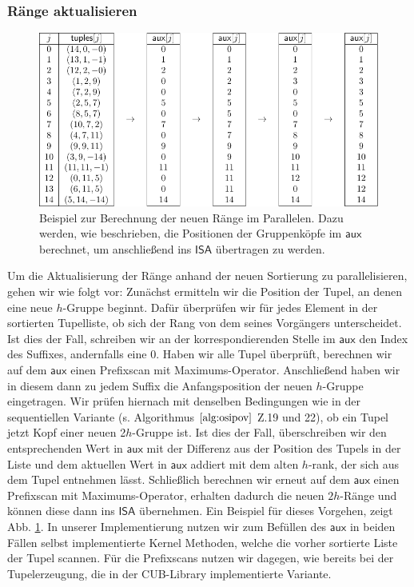 \subsubsection{Ränge aktualisieren}
\begin{figure}
\includegraphics[scale=0.9]{kapitel/saca_algorithmen/osipov/update_ranks_example.pdf}
\caption{Beispiel zur Berechnung der neuen Ränge im Parallelen. Dazu werden, wie beschrieben, die Positionen der Gruppenköpfe im $\mathsf{aux}$ berechnet, um anschließend ins $\mathsf{ISA}$ übertragen zu werden.}
\label{osipov:update}
\end{figure}
Um die Aktualisierung der Ränge anhand der neuen Sortierung zu parallelisieren, gehen wir wie folgt vor:
Zunächst ermitteln wir die Position der Tupel, an denen eine neue $h$-Gruppe beginnt. Dafür überprüfen wir für jedes Element in der sortierten Tupelliste, ob sich der Rang von dem seines Vorgängers unterscheidet. Ist dies der Fall, schreiben wir an der korrespondierenden Stelle im $\mathsf{aux}$ den Index des Suffixes, andernfalls eine 0. Haben wir alle Tupel überprüft, berechnen wir auf dem $\mathsf{aux}$ einen Prefixscan mit Maximums-Operator. Anschließend haben wir in diesem dann zu jedem Suffix die Anfangsposition der neuen $h$-Gruppe eingetragen. 
Wir prüfen hiernach mit denselben Bedingungen wie in der sequentiellen Variante (s. Algorithmus $\ref{alg:osipov}$ Z.19 und 22), ob ein Tupel jetzt Kopf einer neuen 2$h$-Gruppe ist. Ist dies der Fall, überschreiben wir den entsprechenden Wert in $\mathsf{aux}$ mit der Differenz aus der Position des Tupels in der Liste und dem aktuellen Wert in $\mathsf{aux}$ addiert mit dem alten $h$-rank, der sich aus dem Tupel entnehmen lässt. Schließlich berechnen wir erneut auf dem $\mathsf{aux}$ einen Prefixscan mit Maximums-Operator, erhalten dadurch die neuen $2h$-Ränge und können diese dann ins $\mathsf{ISA}$ übernehmen. Ein Beispiel für dieses Vorgehen, zeigt Abb. \ref{osipov:update}.
In unserer Implementierung nutzen wir zum Befüllen des $\mathsf{aux}$ in beiden Fällen selbst implementierte Kernel Methoden, welche die vorher sortierte Liste der Tupel scannen. Für die Prefixscans nutzen wir dagegen, wie bereits bei der Tupelerzeugung, die in der CUB-Library implementierte Variante.

